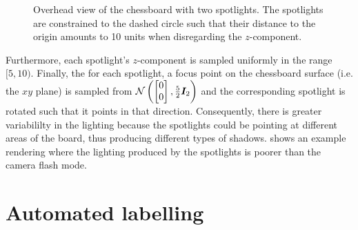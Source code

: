 \documentclass[../main.tex]{subfiles}
\begin{document}
\begin{enumerate}
\begin{figure}
            \caption[Overhead view of the chessboard with two spotlights.]{Overhead view of the chessboard with two spotlights. The spotlights are constrained to the dashed circle such that their distance to the origin amounts to 10 units when disregarding the $z$-component.}
            \label{fig:chessboard_lighting_circle}
        \end{figure}
        Furthermore, each spotlight's $z$-component is sampled uniformly in the range $[5, 10)$.
        Finally, the for each spotlight, a focus point on the chessboard surface (i.e. the $xy$ plane) is sampled from
        \(
            \mathcal{N}\left(
                \begin{bmatrix}
                    0 \\ 0
                \end{bmatrix},
                \frac{5}{2} {\bm{I}}_2
            \right)
        \)
        and the corresponding spotlight is rotated such that it points in that direction.
        Consequently, there is greater variabililty in the lighting because the spotlights could be pointing at different areas of the board, thus producing different types of shadows.
         shows an example rendering where the lighting produced by the spotlights is poorer than the camera flash mode.
\end{enumerate}

\section{Automated labelling}
\end{document}
